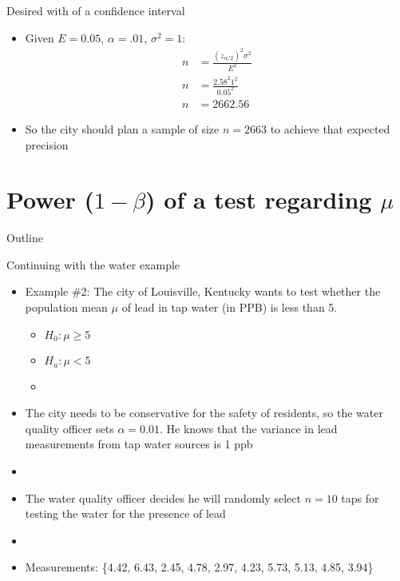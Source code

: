 \documentclass[xcolor=dvipsnames]{beamer}
\begin{document}
\begin{frame}{Desired with of a confidence interval}
\begin{itemize}
	\item Given $E = 0.05$, $\alpha = .01$, $\sigma^2 = 1$:
	\begin{align*}
		n &= \frac{(z_{\alpha/2})^2 \sigma^2}{E^2}\\
		n &=\frac{2.58^2 1^2}{0.05^2} \\
		n &= 2662.56
	\end{align*}
	\item So the city should plan a sample of size $n = 2663$ to achieve that expected precision
\end{itemize}
\end{frame}

\section{Power ($1-\beta$) of a test regarding $\mu$}

\begin{frame}{Outline}
	\tableofcontents[currentsection,subsectionstyle=show/shaded/hide]
\end{frame}

\begin{frame}{Continuing with the water example}
	\begin{itemize}
		\item Example \#2: The city of Louisville, Kentucky wants to test whether the population mean $\mu$ of lead in tap water (in PPB) is less than 5.
		\begin{itemize}
			\item $H_0: \mu \geq 5$
			\item $H_a: \mu < 5$
			\item[]
		\end{itemize}
		\item The city needs to be conservative for the safety of residents, so the water quality officer sets $\alpha = 0.01$. He knows that the variance in lead measurements from tap water sources is 1 ppb
		\item[]
		\item The water quality officer decides he will randomly select $n=10$ taps for testing the water for the presence of lead
		\item[]
		\item Measurements: \{4.42, 6.43, 2.45, 4.78, 2.97, 4.23, 5.73, 5.13, 4.85, 3.94\}
	\end{itemize}
\end{frame}
\end{document}
